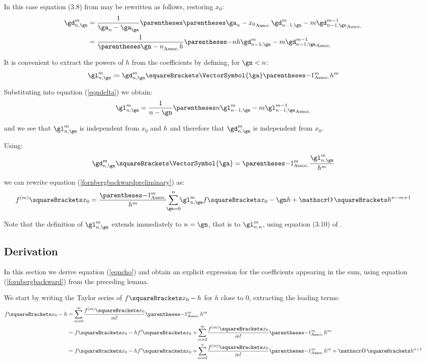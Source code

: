 \documentclass[10pt, a4paper, twoside]{basestyle}
\begin{document}
In this case equation (3.8) from \cite{Fornberg1988} may be rewritten as follows, restoring $x_0$:
\begin{align}
\gd^{m}_{n,\gn} &= \frac{1}{\ga_n - \ga_\gn}\pa{\pa{\ga_n - x_0} \gd^{m}_{n - 1,\gn} - m \gd^{m - 1}_{n - 1,\gn}} \nonumber \\
&= \frac{1}{\pa{\gn - n} h} \pa{-n h \gd^{m}_{n - 1,\gn} - m \gd^{m - 1}_{n - 1,\gn}} \label{eqndelta}
\end{align}

It is convenient to extract the powers of $h$ from the coefficients by defining, for $\gn < n$:
\[
\gl^{m}_{n,\gn} \DefineAs \gd^{m}_{n,\gn}\of{\VectorSymbol{\ga}} \pa{-1}^m h^m
\]

Substituting into equation (\ref{eqndelta}) we obtain:
\[
\gl^{m}_{n,\gn} = \frac{1}{n - \gn} \pa{n \gl^{m}_{n - 1,\gn} - m \gl^{m - 1}_{n - 1,\gn}}
\]

and we see that $\gl^{m}_{n,\gn}$ is independent from $x_0$ and $h$ and therefore that $\gd^{m}_{n,\gn}$ is independent from $x_0$.

Using:
\[
\gd^{m}_{n,\gn}\of{\VectorSymbol{\ga}} = \pa{-1}^m \frac{\gl^{m}_{n,\gn}}{h^m}
\]

we can rewrite equation (\ref{fornbergbackwardpreliminary}) as:
\begin{equation}
f^{(m)}\of{x_0} = \frac{\pa{-1}^m}{h^m} \sum{\gn = 0}[n]{\gl^{m}_{n,\gn} f\of{x_0 - \gn h}} + \BigO\of{h^{n - m + 1}} 
\label{fornbergbackward}
\end{equation}

Note that the definition of $\gl^{m}_{n,\gn}$ extends immediately to $n = \gn$, that is to $\gl^{m}_{n,n}$, using equation (3.10) of \cite{Fornberg1988}.


\subsection*{Derivation}
In this section we derive equation (\ref{eqncho}) and obtain an explicit expression for the coefficients appearing in the sum, using equation (\ref{fornbergbackward}) from the preceding lemma.

We start by writing the Taylor series of $f\of{x_0 - h}$ for $h$ close to $0$, extracting the leading terms:
\begin{align}
f\of{x_0 - h} &= \sum{m = 0}[\infty]{\frac{f^{(m)}\of{x_0}}{\Factorial{m}} \pa{-1}^m h^m} \nonumber \\
&=f\of{x_0} - h f\der\of{x_0} + \sum{m = 2}[\infty]{\frac{f^{(m)}\of{x_0}}{\Factorial{m}} \pa{-1}^m h^m} \nonumber \\
&=f\of{x_0} - h f\der\of{x_0} + \sum{m = 2}[n]{\frac{f^{(m)}\of{x_0}}{\Factorial{m}} \pa{-1}^m h^m} + \BigO\of{h^{n+1}} \label{eqntaylorn}
\end{align}
\end{document}
